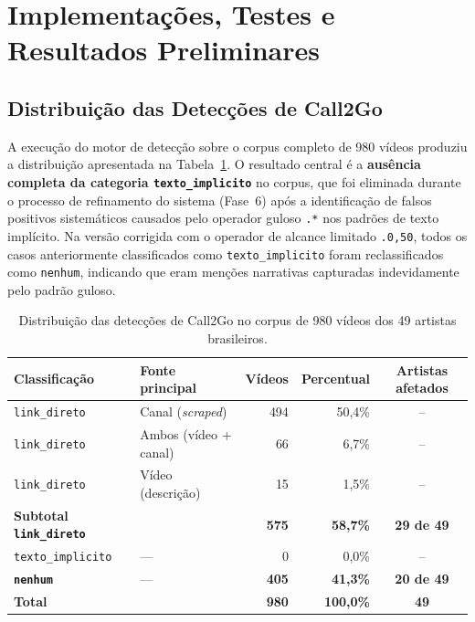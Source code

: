 \documentclass[12pt, a4paper]{article}
\begin{document}
\section{Implementações, Testes e Resultados Preliminares}
\label{sec:resultados}

\subsection{Distribuição das Detecções de Call2Go}

A execução do motor de detecção sobre o corpus completo de 980 vídeos produziu a distribuição apresentada na Tabela~\ref{tab:deteccao}. O resultado central é a \textbf{ausência completa da categoria \texttt{texto\_implicito}} no corpus, que foi eliminada durante o processo de refinamento do sistema (Fase~6) após a identificação de falsos positivos sistemáticos causados pelo operador guloso \texttt{.*} nos padrões de texto implícito. Na versão corrigida com o operador de alcance limitado \texttt{.{0,50}}, todos os casos anteriormente classificados como \texttt{texto\_implicito} foram reclassificados como \texttt{nenhum}, indicando que eram menções narrativas capturadas indevidamente pelo padrão guloso.

\begin{table}[H]
\centering
\caption{Distribuição das detecções de Call2Go no corpus de 980 vídeos dos 49 artistas brasileiros.}
\label{tab:deteccao}
\renewcommand{\arraystretch}{1.3}
\begin{tabular}{@{}llrrc@{}}
\toprule
\textbf{Classificação} & \textbf{Fonte principal} & \textbf{Vídeos} & \textbf{Percentual} & \textbf{Artistas afetados} \\
\midrule
\texttt{link\_direto} & Canal (\textit{scraped}) & 494 & 50,4\% & -- \\
\texttt{link\_direto} & Ambos (vídeo + canal) & 66 & 6,7\% & -- \\
\texttt{link\_direto} & Vídeo (descrição) & 15 & 1,5\% & -- \\
\textbf{Subtotal \texttt{link\_direto}} & & \textbf{575} & \textbf{58,7\%} & \textbf{29 de 49} \\
\midrule
\texttt{texto\_implicito} & --- & 0 & 0,0\% & -- \\
\midrule
\textbf{\texttt{nenhum}} & --- & \textbf{405} & \textbf{41,3\%} & \textbf{20 de 49} \\
\midrule
\textbf{Total} & & \textbf{980} & \textbf{100,0\%} & \textbf{49} \\
\bottomrule
\end{tabular}
\end{table}
\end{document}
